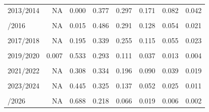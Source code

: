 \begin{table}[!h]
\begin{tabular}{lrrrrrrr}
2013/2014 & NA & 0.000 & 0.377 & 0.297 & 0.171 & 0.082 & 0.042\\
\cellcolor{gray!10}{2014/2015} & \cellcolor{gray!10}{NA} & \cellcolor{gray!10}{0.006} & \cellcolor{gray!10}{0.462} & \cellcolor{gray!10}{0.311} & \cellcolor{gray!10}{0.134} & \cellcolor{gray!10}{0.053} & \cellcolor{gray!10}{0.020}\\
\addlinespace
2015/2016 & NA & 0.015 & 0.486 & 0.291 & 0.128 & 0.054 & 0.021\\
\cellcolor{gray!10}{2016/2017} & \cellcolor{gray!10}{NA} & \cellcolor{gray!10}{0.179} & \cellcolor{gray!10}{0.387} & \cellcolor{gray!10}{0.234} & \cellcolor{gray!10}{0.115} & \cellcolor{gray!10}{0.050} & \cellcolor{gray!10}{0.021}\\
2017/2018 & NA & 0.195 & 0.339 & 0.255 & 0.115 & 0.055 & 0.023\\
\cellcolor{gray!10}{2018/2019} & \cellcolor{gray!10}{NA} & \cellcolor{gray!10}{0.303} & \cellcolor{gray!10}{0.378} & \cellcolor{gray!10}{0.184} & \cellcolor{gray!10}{0.080} & \cellcolor{gray!10}{0.034} & \cellcolor{gray!10}{0.011}\\
2019/2020 & 0.007 & 0.533 & 0.293 & 0.111 & 0.037 & 0.013 & 0.004\\
\addlinespace
\cellcolor{gray!10}{2020/2021} & \cellcolor{gray!10}{0.340} & \cellcolor{gray!10}{0.371} & \cellcolor{gray!10}{0.178} & \cellcolor{gray!10}{0.075} & \cellcolor{gray!10}{0.022} & \cellcolor{gray!10}{0.009} & \cellcolor{gray!10}{0.004}\\
2021/2022 & NA & 0.308 & 0.334 & 0.196 & 0.090 & 0.039 & 0.019\\
\cellcolor{gray!10}{2022/2023} & \cellcolor{gray!10}{NA} & \cellcolor{gray!10}{0.413} & \cellcolor{gray!10}{0.294} & \cellcolor{gray!10}{0.172} & \cellcolor{gray!10}{0.073} & \cellcolor{gray!10}{0.031} & \cellcolor{gray!10}{0.010}\\
2023/2024 & NA & 0.445 & 0.325 & 0.137 & 0.052 & 0.025 & 0.011\\
\cellcolor{gray!10}{2024/2025} & \cellcolor{gray!10}{NA} & \cellcolor{gray!10}{0.390} & \cellcolor{gray!10}{0.333} & \cellcolor{gray!10}{0.166} & \cellcolor{gray!10}{0.073} & \cellcolor{gray!10}{0.027} & \cellcolor{gray!10}{0.008}\\
\addlinespace
2025/2026 & NA & 0.688 & 0.218 & 0.066 & 0.019 & 0.006 & 0.002\\
\bottomrule
\end{tabular}
\end{table}
